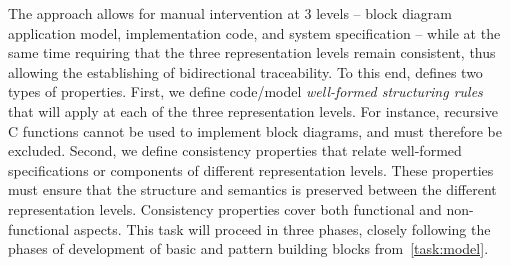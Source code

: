 \begin{Workpackage}{\thewpno}
\begin{Task}

\TaskResults{
\ref{del:model1}
\ref{del:model2}
\ref{del:model3}
}
\TaskHeader{}
The \TheProject{} approach allows for manual intervention at 3 levels -- block diagram application model, implementation code, and system specification -- while at the same time requiring that the three representation levels remain consistent, thus allowing the establishing of bidirectional traceability. To this end, \theTask{} defines two types of properties. First, we define code/model {\em well-formed structuring rules} that will apply at each of the three representation levels. For instance, recursive C functions cannot be used to implement block diagrams, and must therefore be excluded. Second, we define consistency properties that relate well-formed specifications or components of different representation levels. These properties must ensure that the structure and semantics is preserved between the different representation levels.
Consistency properties cover both functional and non-functional aspects.
This task will proceed in three phases, closely following the phases of development of basic and pattern building blocks from~\ref{task:model}. 
\end{Task}


\end{Workpackage}
